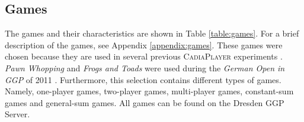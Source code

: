 \documentclass[journal]{IEEEtran}
\begin{document}
\subsection{Games}
\label{subsec:games}
The games and their characteristics are shown in Table \ref{table:games}. For a brief description of the games, see Appendix \ref{appendix:games}.
These games were chosen because they are used in several previous \textsc{CadiaPlayer} experiments \cite{finnssonthesis,FinnssonB08a,FinnssonB09a,BjornssonF09,FinnssonB10a,FinnssonB11a,finnsonphdthesis}. \textit{Pawn Whopping} and \textit{Frogs and Toads} were used during the \textit{German Open in GGP} of 2011 \cite{germanopen}. Furthermore, this selection contains different types of games. Namely, one-player games, two-player games, multi-player games, constant-sum games and general-sum games. All games can be found on the Dresden GGP Server\cite{dresdenserver}.
\end{document}
